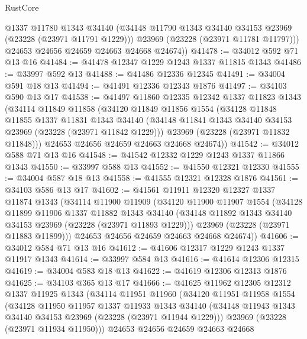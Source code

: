 \begin{lexlean}{RustCore}
\begin{coremodule}
          @1337
          @11780
          @1343
          @34140
          (@34148 @11790 @1343 @34140 @34153 @23969 (@23228 (@23971 @11791 @1229)))
          @23969
          (@23228 (@23971 @11781 @11797)))
        @24653
        @24656
        @24659
        @24663
        @24668
        @24674))
@41478 := @34012 @592 @71 @13 @16
@41484 := @41478 @12347 @1229 @1243 @1337 @11815 @1343
@41486 := @33997 @592 @13
@41488 := @41486 @12336 @12345
@41491 := @34004 @591 @18 @13
@41494 := @41491 @12336 @12343 @1876
@41497 := @34103 @590 @13 @17
@41538 := @41497
    @11860
    @12335
    @12342
    @1337
    @11823
    @1343
    (@34114
      @11849
      @11858
      (@34120
        @11849
        @11856
        @1554
        (@34128
          @11848
          @11855
          @1337
          @11831
          @1343
          @34140
          (@34148 @11841 @1343 @34140 @34153 @23969 (@23228 (@23971 @11842 @1229)))
          @23969
          (@23228 (@23971 @11832 @11848)))
        @24653
        @24656
        @24659
        @24663
        @24668
        @24674))
@41542 := @34012 @588 @71 @13 @16
@41548 := @41542 @12332 @1229 @1243 @1337 @11866 @1343
@41550 := @33997 @588 @13
@41552 := @41550 @12321 @12330
@41555 := @34004 @587 @18 @13
@41558 := @41555 @12321 @12328 @1876
@41561 := @34103 @586 @13 @17
@41602 := @41561
    @11911
    @12320
    @12327
    @1337
    @11874
    @1343
    (@34114
      @11900
      @11909
      (@34120
        @11900
        @11907
        @1554
        (@34128
          @11899
          @11906
          @1337
          @11882
          @1343
          @34140
          (@34148 @11892 @1343 @34140 @34153 @23969 (@23228 (@23971 @11893 @1229)))
          @23969
          (@23228 (@23971 @11883 @11899)))
        @24653
        @24656
        @24659
        @24663
        @24668
        @24674))
@41606 := @34012 @584 @71 @13 @16
@41612 := @41606 @12317 @1229 @1243 @1337 @11917 @1343
@41614 := @33997 @584 @13
@41616 := @41614 @12306 @12315
@41619 := @34004 @583 @18 @13
@41622 := @41619 @12306 @12313 @1876
@41625 := @34103 @365 @13 @17
@41666 := @41625
    @11962
    @12305
    @12312
    @1337
    @11925
    @1343
    (@34114
      @11951
      @11960
      (@34120
        @11951
        @11958
        @1554
        (@34128
          @11950
          @11957
          @1337
          @11933
          @1343
          @34140
          (@34148 @11943 @1343 @34140 @34153 @23969 (@23228 (@23971 @11944 @1229)))
          @23969
          (@23228 (@23971 @11934 @11950)))
        @24653
        @24656
        @24659
        @24663
        @24668

\end{coremodule}
\end{lexlean}
